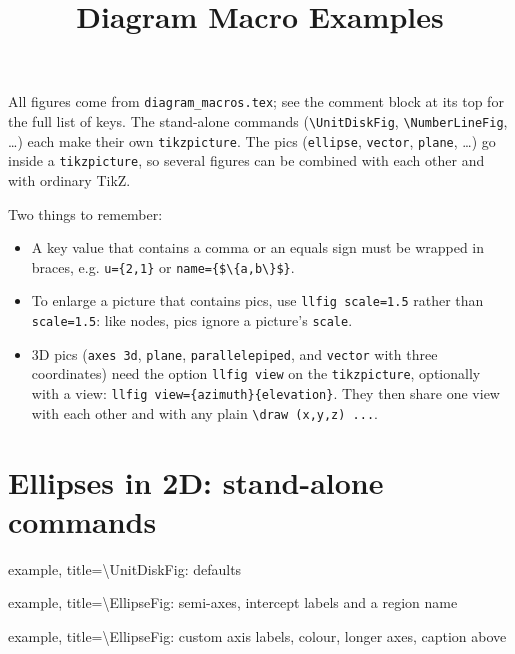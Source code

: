 \documentclass[11pt]{article}
\title{Diagram Macro Examples}
\date{}
\begin{document}
\maketitle

All figures come from \texttt{diagram\_macros.tex}; see the comment block at
its top for the full list of keys. The stand-alone commands
(\verb|\UnitDiskFig|, \verb|\NumberLineFig|, \ldots) each make their own
\texttt{tikzpicture}. The pics (\texttt{ellipse}, \texttt{vector},
\texttt{plane}, \ldots) go inside a \texttt{tikzpicture}, so several
figures can be combined with each other and with ordinary TikZ.

Two things to remember:
\begin{itemize}
  \item A key value that contains a comma or an equals sign must be
        wrapped in braces, e.g.
        \verb|u={2,1}| or \verb|name={$\{a,b\}$}|.
  \item To enlarge a picture that contains pics, use
        \verb|llfig scale=1.5| rather than \verb|scale=1.5|: like nodes,
        pics ignore a picture's \verb|scale|.
  \item 3D pics (\texttt{axes 3d}, \texttt{plane}, \texttt{parallelepiped},
        and \texttt{vector} with three coordinates) need the option
        \verb|llfig view| on the \texttt{tikzpicture}, optionally with a view:
        \verb|llfig view={azimuth}{elevation}|. They then share one view
        with each other and with any plain \verb|\draw (x,y,z) ...|.
\end{itemize}

\section*{Ellipses in 2D: stand-alone commands}

\begin{tcblisting}{example, title={\textbackslash UnitDiskFig: defaults}}
\UnitDiskFig
\end{tcblisting}

\begin{tcblisting}{example, title={\textbackslash EllipseFig: semi-axes,
    intercept labels and a region name}}
\EllipseFig[a=2, b=1, a label=$a$, b label=$b$, name=$E$]
\end{tcblisting}

\begin{tcblisting}{example, title={\textbackslash EllipseFig: custom axis
    labels, colour, longer axes, caption above}}
\EllipseFig[a=1.5, b=.75, x1 label=$u_1$, x2 label=$u_2$,
            fill=blue!25, overhang=1, label above={$x_1^2/a^2 + x_2^2/b^2 \le 1$}]
\end{tcblisting}
\end{document}
